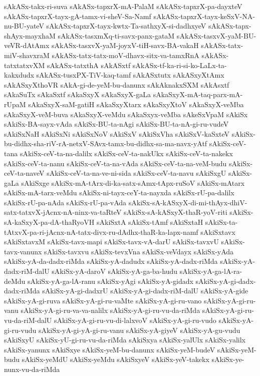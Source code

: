 {sAkASx-takx-ri-suva
sAkASx-tapxrX-mA-PalaM
sAkASx-tapxrX-pa-dayxteV
sAkASx-tapxrX-tayx-gA-tamx-vi-sheV-Sa-Namf
sAkASx-tapxrX-tayx-keSxV-NA-nu-BU-yateV
sAkASx-tapxrX-tayx-kwtx-Ta-sathxyX-si-dadhxyeV
sAkASx-tapx-shAyx-mayxhaM
sAkASx-tasxmXq-ti-savx-panx-gataM
sAkASx-tasxvX-yaM-BU-veVR-dAtAmx
sAkASx-tasxvX-yaM-joyxV-tiH-savx-BA-vakaH
sAkASx-tatx-miV-shavxraM
sAkASx-tatx-tatx-moV-dhavx-sitx-va-tamxRnA
sAkASx-tatxtatxvXM
sAkASx-tatxthA
sAkASxtf
sAkASx-tf-ka-ri-si-ko-LaLx-ta-kakxdudx
sAkASx-tusxPX-TiV-kaq-tamf
sAkASxtutx
sAkASxyXtAmx
sAkASxyXthoVR
sAkA-gi-de-yeM-bu-danunx
sAkAknakxSXM
sAkAsxtf
sAkaSuTx
sAkaSxtf
sAkaSxyX
sAkaSxyX-gaLa
sAkaSxyX-mA-taq-parx-mA-rUpaM
sAkaSxyX-saM-gatiH
sAkaSxyXtarx
sAkaSxyXtoV
sAkaSxyX-veMba
sAkaSxyX-veM-buva
sAkaSxyX-veMdu
sAkaSxyx-veMba
sAkeSxVpaM
sAkiSx
sAkiSx-BA-sayx-vAda
sAkiSx-BU-ta-nAgi
sAkiSx-BU-ta-nA-gi-ru-vudeV
sAkiSxNaH
sAkiSxNi
sAkiSxNoV
sAkiSxV
sAkiSxVha
sAkiSxV-kaSxteV
sAkiSx-bu-didhx-sha-riV-rA-netxV-SAvx-tamx-bu-didhx-sa-ma-navx-yAtf
sAkiSx-ceV-tana
sAkiSx-ceV-ta-na-dalilx
sAkiSx-ceV-ta-nakUkx
sAkiSx-ceV-ta-nakekx
sAkiSx-ceV-ta-nanu
sAkiSx-ceV-ta-na-vAda
sAkiSx-ceV-ta-na-veM-budu
sAkiSx-ceV-ta-naveV
sAkiSx-ceV-ta-na-ve-ni-sida
sAkiSx-ceV-ta-navu
sAkiSxgU
sAkiSx-gaLa
sAkiSxge
sAkiSx-mA-tArx-di-ka-satx-sAmx-tApx-ruSoV
sAkiSx-mAtarx
sAkiSx-mA-tarx-veMdu
sAkiSx-ni-tayx-ceY-ta-nayxda
sAkiSx-rU-pa-dalilx
sAkiSx-rU-pa-nAda
sAkiSx-rU-pa-vAda
sAkiSx-sA-kASxyX-di-mi-thAyx-dhiV-satx-tatxvX-jAcnx-nA-ninx-va-taRteV
sAkiSx-sA-kASxyX-thaR-yoV-riti
sAkiSx-sA-kaSxyX-pa-dA-thaRyoVH
sAkiSxtA
sAkiSx-tAmf
sAkiSxtaH
sAkiSx-ta-tAtxvX-pa-ri-jAcnx-nA-tatx-divx-ru-dAdhx-thaR-ka-lapx-namf
sAkiSxtavx
sAkiSxtavxM
sAkiSx-tavx-mapi
sAkiSx-tavx-vA-darU
sAkiSx-tavxvU
sAkiSx-tavx-vanunx
sAkiSx-tavxvu
sAkiSx-tevxVna
sAkiSx-veVdayx
sAkiSx-yAda
sAkiSx-yA-da-dadx-riMda
sAkiSx-yA-dadudx
sAkiSx-yA-dadx-riMda
sAkiSx-yA-dadx-riM-dalU
sAkiSx-yA-daroV
sAkiSx-yA-ga-ba-hudu
sAkiSx-yA-ga-lA-ra-deMdu
sAkiSx-yA-ga-lA-ranu
sAkiSx-yAgi
sAkiSx-yA-gidadx
sAkiSx-yA-gi-dadx-dadx-riMda
sAkiSx-yA-gi-dadxrU
sAkiSx-yA-gi-dadx-riM-dalU
sAkiSx-yA-gide
sAkiSx-yA-gi-ruva
sAkiSx-yA-gi-ru-vaMte
sAkiSx-yA-gi-ru-vano
sAkiSx-yA-gi-ru-vanu
sAkiSx-yA-gi-ru-va-va-nalilx
sAkiSx-yA-gi-ru-vu-da-riMda
sAkiSx-yA-gi-ru-vu-da-riM-dalU
sAkiSx-yA-gi-ru-vu-di-lalxvoV
sAkiSx-yA-gi-ru-vudo
sAkiSx-yA-gi-ru-vudu
sAkiSx-yA-gi-yA-gi-ru-vanu
sAkiSx-yA-giyeV
sAkiSx-yA-gu-vudu
sAkiSxyU
sAkiSx-yU-gi-ru-vu-da-riMda
sAkiSxya
sAkiSx-yalUlx
sAkiSx-yalilx
sAkiSx-yanunx
sAkiSxye
sAkiSx-yeM-bu-danunx
sAkiSx-yeM-budeV
sAkiSx-yeM-budu
sAkiSx-yeMdU
sAkiSx-yeMdu
sAkiSxyeV
sAkiSx-yeV-takekx
sAkiSx-ye-nunx-vu-da-riMda
}
